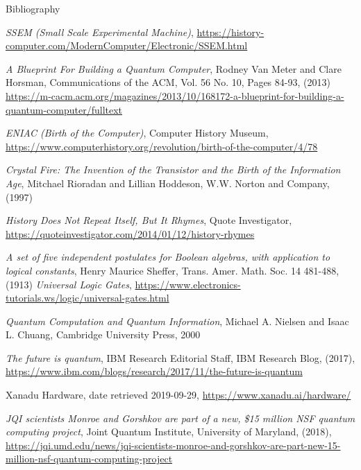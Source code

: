 \begin{frame}[allowframebreaks]{Bibliography}
  \begin{thebibliography}{99}
    \emph{SSEM (Small Scale Experimental Machine)}, %
    \url{https://history-computer.com/ModernComputer/Electronic/SSEM.html}

    \emph{A Blueprint For Building a Quantum Computer}, %
    Rodney Van Meter and Clare Horsman, %
    Communications of the ACM, Vol. 56 No. 10, Pages 84-93, (2013) %
    \url{https://m-cacm.acm.org/magazines/2013/10/168172-a-blueprint-for-building-a-quantum-computer/fulltext}

    \emph{ENIAC (Birth of the Computer)}, %
    Computer History Museum, %
    \url{https://www.computerhistory.org/revolution/birth-of-the-computer/4/78}

    \emph{Crystal Fire: The Invention of the Transistor and the Birth of the Information Age}, %
    Mitchael Rioradan and Lillian Hoddeson, %
    W.W. Norton and Company, (1997)
    
    \emph{History Does Not Repeat Itself, But It Rhymes}, %
    Quote Investigator, %
    \url{https://quoteinvestigator.com/2014/01/12/history-rhymes}

    
    \emph{A set of five independent postulates for Boolean algebras, with application to logical constants}, %
    Henry Maurice Sheffer, %
    Trans. Amer. Math. Soc. 14 481-488, (1913)
    \emph{Universal Logic Gates}, %
    \url{https://www.electronics-tutorials.ws/logic/universal-gates.html}
    
    \emph{Quantum Computation and Quantum Information},
    Michael A. Nielsen and Isaac L. Chuang, %
    Cambridge University Press, %
    2000

    \emph{The future is quantum}, %
    IBM Research Editorial Staff, %
    IBM Research Blog, (2017), %
    \url{https://www.ibm.com/blogs/research/2017/11/the-future-is-quantum}

    Xanadu Hardware, %
    date retrieved 2019-09-29, 
    \url{https://www.xanadu.ai/hardware/}

    \emph{JQI scientists Monroe and Gorshkov are part of a new, \$15 million
      NSF quantum computing project}, %
    Joint Quantum Institute, University of Maryland, (2018), %
    \url{https://jqi.umd.edu/news/jqi-scientists-monroe-and-gorshkov-are-part-new-15-million-nsf-quantum-computing-project}


\end{thebibliography}
\end{frame}
